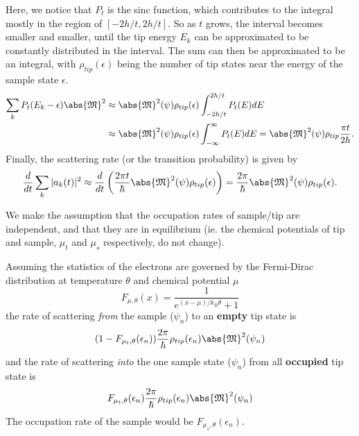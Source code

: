 Here, we notice that $P_t$ is the sinc function, which contributes to the integral mostly in the region of $[-2h/t, 2h/t]$. So as $t$ grows, the interval becomes smaller and smaller, until the tip energy $E_k$ can be approximated to be constantly distributed in the interval. The sum can then be approximated to be an integral, with $\rho_{tip}(\epsilon)$ being the number of tip states near the energy of the sample state $\epsilon$. 
\begin{align}
\sum_k P_t(E_k - \epsilon) \abs{\mathfrak{M}}^2 &\approx \abs{\mathfrak{M}}^2(\psi) \rho_{tip}(\epsilon) \int_{-2h/t}^{2h/t} P_t(E) dE \\
& \approx \abs{\mathfrak{M}}^2(\psi) \rho_{tip}(\epsilon) \int_{-\infty}^{\infty} P_t(E) dE = \abs{\mathfrak{M}}^2(\psi) \rho_{tip} \frac{\pi t}{2\hbar}.
\end{align}
Finally, the scattering rate (or the transition probability) is given by
\begin{equation}
\frac{d}{dt} \sum_k |a_k(t)|^2 \approx \frac{d}{dt}\left( \frac{2\pi t}{\hbar} \abs{\mathfrak{M}}^2(\psi) \rho_{tip}(\epsilon) \right) = \frac{2 \pi}{\hbar} \abs{\mathfrak{M}}^2(\psi) \rho_{tip}(\epsilon).
\end{equation}

We make the assumption that the occupation rates of sample/tip are independent, and that they are in equilibrium (ie. the chemical potentials of tip and sample, $\mu_t$ and $\mu_s$ respectively, do not change).

Assuming the statistics of the electrons are governed by the Fermi-Dirac distribution at temperature $\theta$ and chemical potential $\mu$
\begin{equation}
F_{\mu, \theta}(x) = \frac{1}{e^{(x-\mu)/k_B\theta} +1}
\end{equation}
the rate of scattering \emph{from} the sample ($\psi_n$) to an \textbf{empty} tip state is
\begin{equation} \label{eq:tersoff:totip}
(1-F_{\mu_t, \theta}(\epsilon_n)) \frac{2\pi}{\hbar} \rho_{tip}(\epsilon_n) \abs{\mathfrak{M}}^2(\psi_n)
\end{equation}
and the rate of scattering \emph{into} the one sample state ($\psi_n$) from all \textbf{occupied} tip state is
\begin{equation} \label{eq:tersoff:fromtip}
F_{\mu_t,\theta}(\epsilon_n) \frac{2\pi}{\hbar} \rho_{tip}(\epsilon_n) \abs{\mathfrak{M}}^2(\psi_n)
\end{equation}
The occupation rate of the sample would be $F_{\mu_s,\theta}(\epsilon_n)$. 

